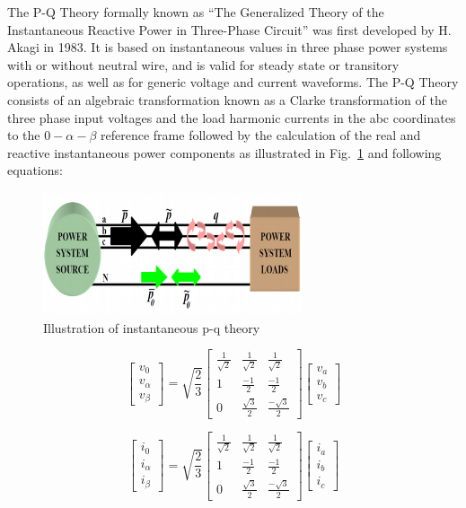 \documentclass[journal,twoside]{IEEEtran}
\begin{document}
\bigskip
The P-Q Theory formally known as “The Generalized Theory of
the Instantaneous Reactive Power in Three-Phase Circuit” was
first developed by H. Akagi in 1983. It is based on
instantaneous values in three phase power systems with or
without neutral wire, and is valid for steady state or transitory
operations, as well as for generic voltage and current
waveforms. The P-Q Theory consists of an algebraic
transformation known as a Clarke transformation of the three
phase input voltages and the load harmonic currents in the abc
coordinates to the $0-\alpha -\beta$ reference frame followed by the
calculation of the real and reactive instantaneous power
components as illustrated in Fig.~\ref{f4} and following equations:

\begin{figure}[!ht]
\centering
\includegraphics[width=3in]{4}
\caption{Illustration of instantaneous p-q theory}
\label{f4}
\end{figure}




\[ \begin{bmatrix} v_0 \\ v_{\alpha} \\v_{\beta} \end{bmatrix}
=\sqrt{\frac{2}{3}} \begin{bmatrix} \frac{1}{\sqrt 2} & \frac{1}{\sqrt 2} &\frac{1}{\sqrt 2}\\ 1 & \frac{-1}{2} & \frac{-1}{2}\\ 0 & \frac{\sqrt 3}{2} & \frac{-\sqrt 3}{2} \end{bmatrix} \begin{bmatrix} v_a \\ v_b \\ v_c \end{bmatrix} \] 


\[ \begin{bmatrix} i_0 \\ i_{\alpha} \\i_{\beta} \end{bmatrix}
=\sqrt{\frac{2}{3}} \begin{bmatrix} \frac{1}{\sqrt 2} & \frac{1}{\sqrt 2} &\frac{1}{\sqrt 2}\\ 1 & \frac{-1}{2} & \frac{-1}{2}\\ 0 & \frac{\sqrt 3}{2} & \frac{-\sqrt 3}{2} \end{bmatrix} \begin{bmatrix} i_a \\ i_b \\ i_c \end{bmatrix} \] 
\end{document}

